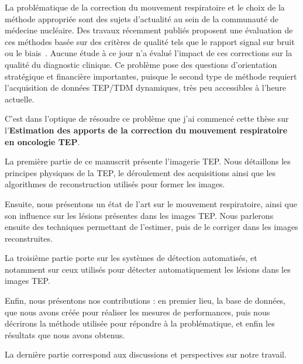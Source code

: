 La problématique de la correction du mouvement respiratoire et le choix de la méthode appropriée sont des sujets d’actualité au sein de la communauté de médecine nucléaire. Des travaux récemment publiés proposent une évaluation de ces méthodes basée sur des critères de qualité tels que le rapport signal sur bruit ou le biais~\cite{visvikis2004evaluation}. Aucune étude à ce jour n’a évalué l’impact de ces corrections sur la qualité du diagnostic clinique. Ce problème pose des questions d’orientation stratégique et financière importantes, puisque le second type de méthode requiert l’acquisition de données TEP/TDM dynamiques, très peu accessibles à l’heure actuelle.

C'est dans l'optique de résoudre ce problème que j'ai commencé cette thèse sur l'\textbf{Estimation des apports de la correction du mouvement respiratoire en oncologie TEP}.


La première partie de ce manuscrit présente l'imagerie TEP. Nous détaillons les principes physiques de la TEP, le déroulement des acquisitions ainsi que les algorithmes de reconstruction utilisés pour former les images.

Ensuite, nous présentons un état de l'art sur le mouvement respiratoire, ainsi que son influence sur les lésions présentes dans les images TEP. Nous parlerons ensuite  des techniques permettant de l'estimer, puis de le corriger dans les images reconstruites.

La troisième partie porte sur les systèmes de détection automatisés, et notamment sur ceux utilisés pour détecter automatiquement les lésions dans les images TEP. 

Enfin, nous présentons nos contributions : en premier lieu, la base de données, que nous avons créée pour réaliser les mesures de performances, puis nous décrirons la méthode utilisée pour répondre à la problématique, et enfin les résultats que nous avons obtenus.

La dernière partie correspond aux discussions et perspectives sur notre travail.